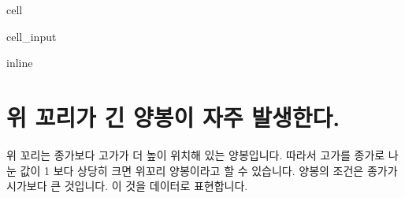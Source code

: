\documentclass[letterpaper,10pt,english]{jupyterBook}
\begin{document}
\begin{sphinxuseclass}{cell}\begin{sphinxVerbatimInput}

\begin{sphinxuseclass}{cell_input}
\begin{sphinxVerbatim}[commandchars=\\\{\}]
   
 inline
   
   
   
 

  
\end{sphinxVerbatim}

\end{sphinxuseclass}\end{sphinxVerbatimInput}

\end{sphinxuseclass}

\part{위 꼬리가 긴 양봉이 자주 발생한다.}
\label{\detokenize{chapter5/5.1.3_Hypothesis_3:id1}}\label{\detokenize{chapter5/5.1.3_Hypothesis_3::doc}}
\sphinxAtStartPar
위 꼬리는 종가보다 고가가 더 높이 위치해 있는 양봉입니다. 따라서 고가를 종가로 나눈 값이 1 보다 상당히 크면 위꼬리 양봉이라고 할 수 있습니다. 양봉의 조건은 종가가 시가보다 큰 것입니다. 이 것을 데이터로 표현합니다.
\end{document}
